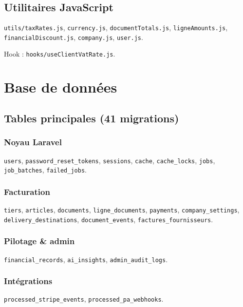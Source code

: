 \documentclass[11pt,a4paper]{report}
\newcommand{\filepath}[1]{\texttt{\small #1}}
\begin{document}
\section{Utilitaires JavaScript}

\filepath{utils/taxRates.js}, \filepath{currency.js}, \filepath{documentTotals.js}, \filepath{ligneAmounts.js}, \filepath{financialDiscount.js}, \filepath{company.js}, \filepath{user.js}.

Hook : \filepath{hooks/useClientVatRate.js}.

\chapter{Base de données}

\section{Tables principales (41 migrations)}

\subsection{Noyau Laravel}
\texttt{users}, \texttt{password\_reset\_tokens}, \texttt{sessions}, \texttt{cache}, \texttt{cache\_locks}, \texttt{jobs}, \texttt{job\_batches}, \texttt{failed\_jobs}.

\subsection{Facturation}
\texttt{tiers}, \texttt{articles}, \texttt{documents}, \texttt{ligne\_documents}, \texttt{payments}, \texttt{company\_settings}, \texttt{delivery\_destinations}, \texttt{document\_events}, \texttt{factures\_fournisseurs}.

\subsection{Pilotage \& admin}
\texttt{financial\_records}, \texttt{ai\_insights}, \texttt{admin\_audit\_logs}.

\subsection{Intégrations}
\texttt{processed\_stripe\_events}, \texttt{processed\_pa\_webhooks}.
\end{document}
